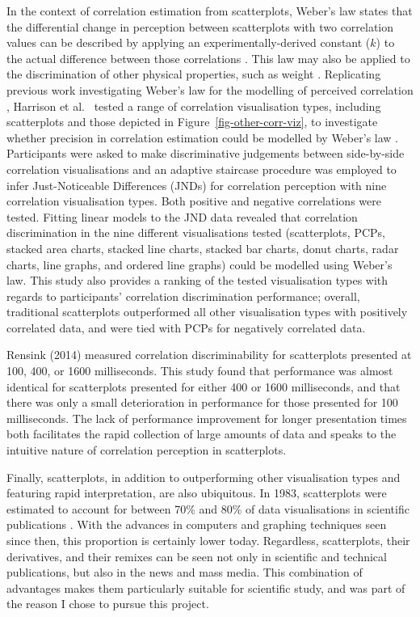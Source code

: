 \documentclass[../main.tex]{subfiles}
\begin{document}
In the context of correlation estimation from scatterplots, Weber's law
states that the differential change in perception between scatterplots
with two correlation values can be described by applying an
experimentally-derived constant (\(k\)) to the actual difference between
those correlations \cite{rensink_2010, harrison_2014}. This law may also
be applied to the discrimination of other physical properties, such as
weight \cite{coren_2004}. Replicating previous work investigating
Weber's law for the modelling of perceived correlation
\cite{rensink_2010}, Harrison et al.~\cite{harrison_2014} tested a range
of correlation visualisation types, including scatterplots and those
depicted in Figure~\ref{fig-other-corr-viz}, to investigate whether
precision in correlation estimation could be modelled by Weber's law
\cite{rensink_2010}. Participants were asked to make discriminative
judgements between side-by-side correlation visualisations and an
adaptive staircase procedure was employed to infer Just-Noticeable
Differences (JNDs) for correlation perception with nine correlation
visualisation types. Both positive and negative correlations were
tested. Fitting linear models to the JND data revealed that correlation
discrimination in the nine different visualisations tested
(scatterplots, PCPs, stacked area charts, stacked line charts, stacked
bar charts, donut charts, radar charts, line graphs, and ordered line
graphs) could be modelled using Weber's law. This study also provides a
ranking of the tested visualisation types with regards to participants'
correlation discrimination performance; overall, traditional
scatterplots outperformed all other visualisation types with positively
correlated data, and were tied with PCPs for negatively correlated data.

Rensink (2014) \cite{rensink_2014} measured correlation discriminability
for scatterplots presented at 100, 400, or 1600 milliseconds. This study
found that performance was almost identical for scatterplots presented
for either 400 or 1600 milliseconds, and that there was only a small
deterioration in performance for those presented for 100 milliseconds.
The lack of performance improvement for longer presentation times both
facilitates the rapid collection of large amounts of data and speaks to
the intuitive nature of correlation perception in scatterplots.

Finally, scatterplots, in addition to outperforming other visualisation
types and featuring rapid interpretation, are also ubiquitous. In 1983,
scatterplots were estimated to account for between 70\% and 80\% of data
visualisations in scientific publications \cite{tufte_1983}. With the
advances in computers and graphing techniques seen since then, this
proportion is certainly lower today. Regardless, scatterplots, their
derivatives, and their remixes can be seen not only in scientific and
technical publications, but also in the news and mass media. This
combination of advantages makes them particularly suitable for
scientific study, and was part of the reason I chose to pursue this
project.
\end{document}
